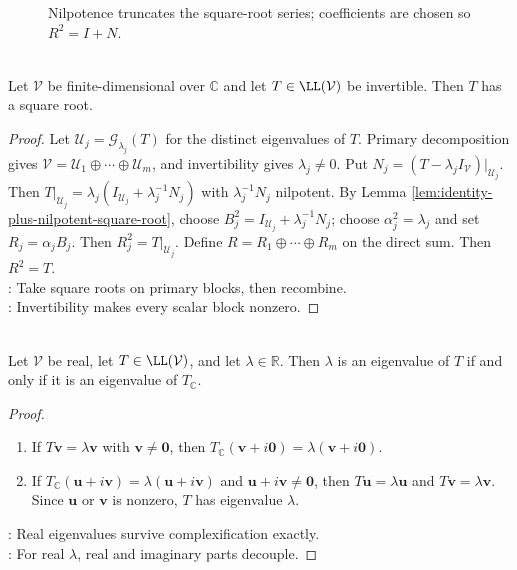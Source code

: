 \begin{figure}[H]
  \centering
  
  \caption{Nilpotence truncates the square-root series; coefficients are chosen so $R^2=I+N$.}
  \label{fig:nilpotent-square-root-polynomial}
\end{figure}

\begin{theorem} \label{thm:complex-invertible-operator-has-square-root} \\
Let $\mathcal{V}$ be finite-dimensional over $\mathbb{C}$ and let $T\in\LL(\mathcal{V})$ be invertible. Then $T$ has a square root.
\begin{proof}
Let $\mathcal{U}_j=\mathcal{G}_{\lambda_j}(T)$ for the distinct eigenvalues of $T$. Primary decomposition gives $\mathcal{V}=\mathcal{U}_1\oplus\cdots\oplus\mathcal{U}_m$, and invertibility gives $\lambda_j\neq0$. Put $N_j=(T-\lambda_jI_{\mathcal{V}})|_{\mathcal{U}_j}$.\\
Then $T|_{\mathcal{U}_j} =\lambda_j\left(I_{\mathcal{U}_j}+\lambda_j^{-1}N_j\right)$ with $\lambda_j^{-1}N_j$ nilpotent. By Lemma \ref{lem:identity-plus-nilpotent-square-root}, choose $B_j^2=I_{\mathcal{U}_j}+\lambda_j^{-1}N_j$; choose $\alpha_j^2=\lambda_j$ and set $R_j=\alpha_jB_j$. Then $R_j^2=T|_{\mathcal{U}_j}$. Define $R=R_1\oplus\cdots\oplus R_m$ on the direct sum. Then $R^2=T$.\\
: Take square roots on primary blocks, then recombine.\\
: Invertibility makes every scalar block nonzero.
\end{proof}
\end{theorem}

\begin{proposition} \label{prop:real-eigenvalues-complexification} \\
Let $\mathcal{V}$ be real, let $T\in\LL(\mathcal{V})$, and let $\lambda\in\mathbb{R}$. Then $\lambda$ is an eigenvalue of $T$ if and only if it is an eigenvalue of $T_{\mathbb{C}}$.
\begin{proof}
\begin{enumerate}[label=\roman*.]
\setlength{\itemsep}{0pt}
\item[$(\Rightarrow)$] If $T\mathbf{v}=\lambda\mathbf{v}$ with $\mathbf{v}\neq\mathbf{0}$, then $T_{\mathbb{C}}(\mathbf{v}+i\mathbf{0})=\lambda(\mathbf{v}+i\mathbf{0})$.
\item[$(\Leftarrow)$] If $T_{\mathbb{C}}(\mathbf{u}+i\mathbf{v})=\lambda(\mathbf{u}+i\mathbf{v})$ and $\mathbf{u}+i\mathbf{v}\neq\mathbf{0}$, then $T\mathbf{u}=\lambda\mathbf{u}$ and $T\mathbf{v}=\lambda\mathbf{v}$.\\
Since $\mathbf{u}$ or $\mathbf{v}$ is nonzero, $T$ has eigenvalue $\lambda$.
\end{enumerate}
: Real eigenvalues survive complexification exactly.\\
: For real $\lambda$, real and imaginary parts decouple.
\end{proof}
\end{proposition}

